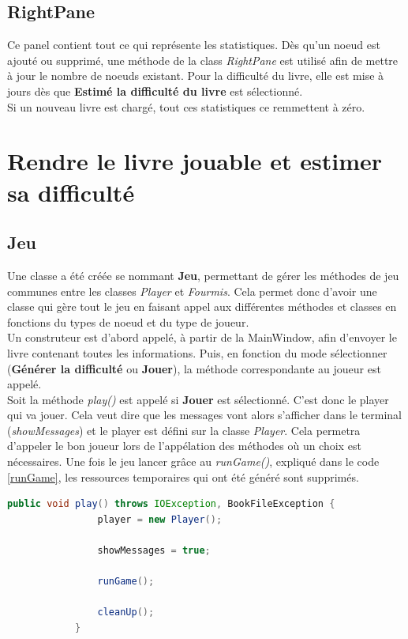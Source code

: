 		\subsection{RightPane}

		Ce panel contient tout ce qui représente les statistiques. Dès qu'un noeud est ajouté ou supprimé, une méthode de la class \textit{RightPane} est utilisé afin de mettre à jour le nombre de noeuds existant. Pour la difficulté du livre, elle est mise à jours dès que \textbf{Estimé la difficulté du livre} est sélectionné.\\
		Si un nouveau livre est chargé, tout ces statistiques ce remmettent à zéro.



	\section{Rendre le livre jouable et estimer sa difficulté}\label{sec:Jeu}
		\subsection{Jeu}
		Une classe a été créée se nommant \textbf{Jeu}, permettant de gérer les méthodes de jeu communes entre les classes \textit{Player} et \textit{Fourmis}. Cela permet donc d'avoir une classe qui gère tout le jeu en faisant appel aux différentes méthodes et classes en fonctions du types de noeud et du type de joueur. \\
		Un construteur est d'abord appelé, à partir de la MainWindow, afin d'envoyer le livre contenant toutes les informations. Puis, en fonction du mode sélectionner (\textbf{Générer la difficulté} ou \textbf{Jouer}), la méthode correspondante au joueur est appelé.\\

		Soit la méthode \textit{play()} est appelé si \textbf{Jouer} est sélectionné. C'est donc le player qui va jouer. Cela veut dire que les messages vont alors s'afficher dans le terminal (\textit{showMessages}) et le player est défini sur la classe \textit{Player}. Cela permetra d'appeler le bon joueur lors de l'appélation des méthodes où un choix est nécessaires.
		Une fois le jeu lancer grâce au \textit{runGame()}, expliqué dans le code \ref{runGame}, les ressources temporaires qui ont été généré sont supprimés.

		\begin{lstlisting}[language=java, caption=play()]
			public void play() throws IOException, BookFileException {
				player = new Player();

				showMessages = true;

				runGame();

				cleanUp();
			}
		\end{lstlisting}

